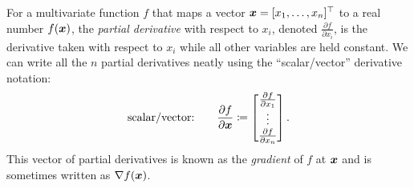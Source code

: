 For a multivariate function \(f\) that maps a vector \(\boldsymbol{x} = [x_1, \dots, x_n]^\top\) to a real number \(f(\boldsymbol{x})\), the \textit{partial derivative} with respect to \(x_i\), denoted \(\frac{\partial f}{\partial x_i}\), is the derivative taken with respect to \(x_i\) while all other variables are held constant. We can write all the \(n\) partial derivatives neatly using the ``scalar/vector'' derivative notation:
\begin{equation}
	\text{scalar/vector:} \qquad \frac{\partial f}{\partial \boldsymbol{x}} \coloneqq
	\begin{bmatrix}
		\frac{\partial f}{\partial x_1} \\
		\vdots                          \\
		\frac{\partial f}{\partial x_n}
	\end{bmatrix}. \label{eq:GradientDef}
\end{equation}
This vector of partial derivatives is known as the \textit{gradient} of \(f\) at \(\boldsymbol{x}\) and is sometimes written as \(\nabla f(\boldsymbol{x})\).

